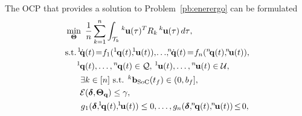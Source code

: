 \documentclass[letterpaper,10pt,conference,twoside]{IEEEtran}
\theoremstyle{definition}
\begin{document}
The OCP that provides a solution to Problem~\ref{pb:enerergo} can be formulated %
\begin{subequations}\label{eq:ocpfinal}\begin{align}
  \min_{\boldsymbol{\Theta}}\,\,\,&{\frac{1}{n}\sum_{k=1}^{n}\int_{\mathcal{T}_k}{}^k\hspace*{-.1ex}\mathbf{u}(\tau)^TR_k\,{}^k\hspace*{-.1ex}\mathbf{u}(\tau)\,d\tau},\label{eq:ocpfinalcost}\\
  \text{\hspace*{.2ex}s.t.\hspace*{.3ex}}{}^1\hspace*{-.4ex}\dot{\mathbf{q}}&(t)\hspace*{-.4ex}=\hspace*{-.6ex}f_1({}^1\hspace*{-.2ex}\mathbf{q}(t),\hspace*{-.8ex}{}^1\hspace*{-.2ex}\mathbf{u}(t)),\hspace*{-.3ex}{\small\dots},\hspace*{-.7ex}{}^n\hspace*{-.3ex}\dot{\mathbf{q}}(t)\hspace*{-.3ex}=\hspace*{-.5ex}f_n({}^n\hspace*{-.4ex}\mathbf{q}(t),\hspace*{-.7ex}{}^n\hspace*{-.4ex}\mathbf{u}(t)),\\
  {}^1\hspace*{-.2ex}\mathbf{q}&(t),\dots,{}^n\hspace*{-.2ex}\mathbf{q}(t)\in\mathcal{Q},\,{}^1\hspace*{-.2ex}\mathbf{u}(t),\dots,{}^n\hspace*{-.2ex}\mathbf{u}(t)\in\mathcal{U},\\
  \exists &k\in[n]\text{ s.t. }{}^k\mathbf{b}_{\text{SoC}}(t_f)\in(0,b_f],\label{eq:battconst}\\
  \mathcal{E}&(\boldsymbol{\delta},\hspace*{-.2ex}\boldsymbol{\Theta}_{\mathbf{q}})\leq\gamma,\label{eq:ergoconst}\\
  g&{}_1(\boldsymbol{\delta},\hspace*{-.6ex}{}^1\hspace*{-.3ex}\mathbf{q}(t),\hspace*{-.6ex}{}^1\hspace*{-.3ex}\mathbf{u}(t))\leq 0,\dots,g_n(\boldsymbol{\delta},\hspace*{-.6ex}{}^n\hspace*{-.3ex}\mathbf{q}(t),\hspace*{-.6ex}{}^n\hspace*{-.3ex}\mathbf{u}(t))\hspace*{-.3ex}\leq\hspace*{-.3ex}0,\label{eq:ocpfinalextra1}\\

\end{align}
\end{subequations}
\end{document}
